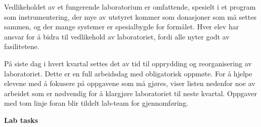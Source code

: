

Vedlikeholdet av et fungerende laboratorium er omfattende, spesielt i et program som instrumentering, der mye av utstyret kommer som donasjoner som må settes sammen, og der mange systemer er spesialbygde for formålet. Hver elev har ansvar for å bidra til vedlikehold av laboratoriet, fordi alle nyter godt av fasilitetene.

På siste dag i hvert kvartal settes det av tid til opprydding og reorganisering av laboratoriet. Dette er en full arbeidsdag med obligatorisk oppmøte. For å hjelpe elevene med å fokusere på oppgavene som må gjøres, viser listen nedenfor noe av arbeidet som er nødvendig for å klargjøre laboratoriet til neste kvartal. Oppgaver med tom linje foran blir tildelt lab-team for gjennomføring.

\vskip 10pt

\noindent
{\bf Lab tasks}

